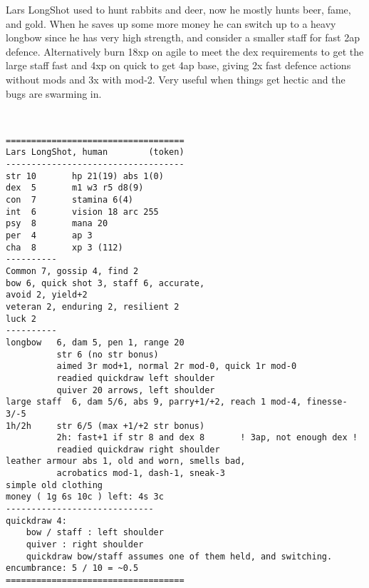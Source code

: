 \clearpage
\begin{samepage}

\noindent Lars LongShot used to hunt rabbits and deer, now he mostly hunts beer, fame, and gold. 
When he saves up some more money he can switch up to a heavy longbow since he has very high strength, and consider a smaller staff for fast 2ap defence. Alternatively burn 18xp on agile to meet the dex requirements to get the large staff fast and 4xp on quick to get 4ap base, giving 2x fast defence actions without mods and 3x with mod-2. Very useful when things get hectic and the bugs are swarming in.

\

\small \begin{verbatim}
===================================
Lars LongShot, human        (token)
-----------------------------------
str 10       hp 21(19) abs 1(0)
dex  5       m1 w3 r5 d8(9)
con  7       stamina 6(4)
int  6       vision 18 arc 255
psy  8       mana 20
per  4       ap 3
cha  8       xp 3 (112)
----------
Common 7, gossip 4, find 2
bow 6, quick shot 3, staff 6, accurate, 
avoid 2, yield+2
veteran 2, enduring 2, resilient 2
luck 2
----------
longbow   6, dam 5, pen 1, range 20
          str 6 (no str bonus)
          aimed 3r mod+1, normal 2r mod-0, quick 1r mod-0 
          readied quickdraw left shoulder
          quiver 20 arrows, left shoulder
large staff  6, dam 5/6, abs 9, parry+1/+2, reach 1 mod-4, finesse-3/-5
1h/2h     str 6/5 (max +1/+2 str bonus)
          2h: fast+1 if str 8 and dex 8       ! 3ap, not enough dex !
          readied quickdraw right shoulder
leather armour abs 1, old and worn, smells bad, 
          acrobatics mod-1, dash-1, sneak-3
simple old clothing
money ( 1g 6s 10c ) left: 4s 3c
-----------------------------
quickdraw 4:
    bow / staff : left shoulder
    quiver : right shoulder
    quickdraw bow/staff assumes one of them held, and switching.
encumbrance: 5 / 10 = ~0.5
===================================
\end{verbatim} \end{samepage} \normalsize





